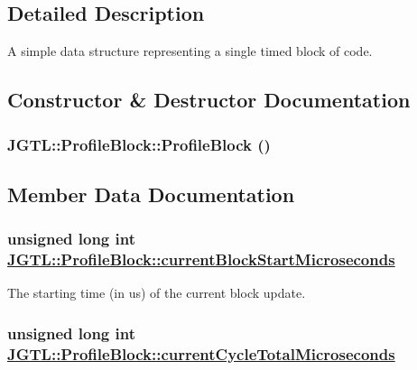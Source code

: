 \subsection{Detailed Description}
A simple data structure representing a single timed block of code. 



\subsection{Constructor \& Destructor Documentation}
\hypertarget{struct_j_g_t_l_1_1_profile_block_978acff6a004461d28e440472dd5d895}{
\subsubsection[ProfileBlock]{\setlength{\rightskip}{0pt plus 5cm}JGTL::Profile\-Block::Profile\-Block ()}}
\label{struct_j_g_t_l_1_1_profile_block_978acff6a004461d28e440472dd5d895}




\subsection{Member Data Documentation}
\hypertarget{struct_j_g_t_l_1_1_profile_block_49aa3dc0ecd58718ecccdb23ff8ca4f5}{
\subsubsection[currentBlockStartMicroseconds]{\setlength{\rightskip}{0pt plus 5cm}unsigned long int \hyperlink{struct_j_g_t_l_1_1_profile_block_49aa3dc0ecd58718ecccdb23ff8ca4f5}{JGTL::Profile\-Block::current\-Block\-Start\-Microseconds}}}
\label{struct_j_g_t_l_1_1_profile_block_49aa3dc0ecd58718ecccdb23ff8ca4f5}


The starting time (in us) of the current block update. 

\hypertarget{struct_j_g_t_l_1_1_profile_block_4dbffcbbb50e7e6affc6116f361a2417}{
\subsubsection[currentCycleTotalMicroseconds]{\setlength{\rightskip}{0pt plus 5cm}unsigned long int \hyperlink{struct_j_g_t_l_1_1_profile_block_4dbffcbbb50e7e6affc6116f361a2417}{JGTL::Profile\-Block::current\-Cycle\-Total\-Microseconds}}}
\label{struct_j_g_t_l_1_1_profile_block_4dbffcbbb50e7e6affc6116f361a2417}


